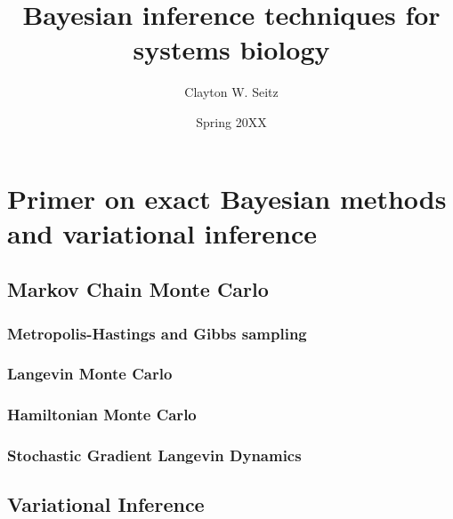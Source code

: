 \documentclass{ucetd}
\title{Bayesian inference techniques for systems biology}
\author{Clayton W. Seitz}
\date{Spring 20XX}
\begin{document}
\maketitle

\makecopyright


\tableofcontents


\abstract



\clearpage

\mainmatter

\chapter{Primer on exact Bayesian methods and variational inference}

\section{Markov Chain Monte Carlo}

\subsection{Metropolis-Hastings and Gibbs sampling}

\subsection{Langevin Monte Carlo} 

\subsection{Hamiltonian Monte Carlo}

\subsection{Stochastic Gradient Langevin Dynamics}

\section{Variational Inference}
\end{document}
